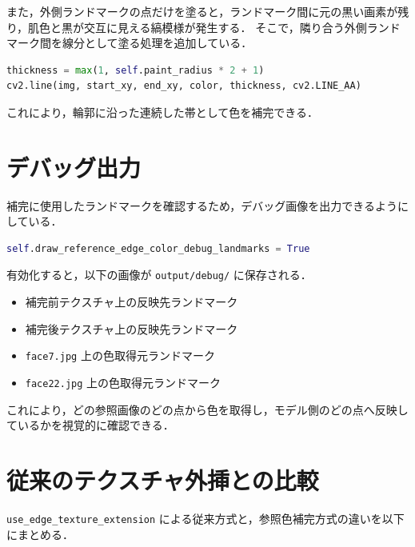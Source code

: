 \documentclass[uplatex,dvipdfmx]{jsarticle}
\begin{document}
また，外側ランドマークの点だけを塗ると，ランドマーク間に元の黒い画素が残り，肌色と黒が交互に見える縞模様が発生する．
そこで，隣り合う外側ランドマーク間を線分として塗る処理を追加している．

\begin{lstlisting}[language=Python]
thickness = max(1, self.paint_radius * 2 + 1)
cv2.line(img, start_xy, end_xy, color, thickness, cv2.LINE_AA)
\end{lstlisting}

これにより，輪郭に沿った連続した帯として色を補完できる．

\section{デバッグ出力}

補完に使用したランドマークを確認するため，デバッグ画像を出力できるようにしている．

\begin{lstlisting}[language=Python]
self.draw_reference_edge_color_debug_landmarks = True
\end{lstlisting}

有効化すると，以下の画像が \verb|output/debug/| に保存される．

\begin{itemize}
  \item 補完前テクスチャ上の反映先ランドマーク
  \item 補完後テクスチャ上の反映先ランドマーク
  \item \verb|face7.jpg| 上の色取得元ランドマーク
  \item \verb|face22.jpg| 上の色取得元ランドマーク
\end{itemize}

これにより，どの参照画像のどの点から色を取得し，モデル側のどの点へ反映しているかを視覚的に確認できる．

\section{従来のテクスチャ外挿との比較}

\verb|use_edge_texture_extension| による従来方式と，参照色補完方式の違いを以下にまとめる．
\end{document}
